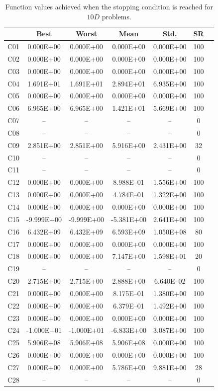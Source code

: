 \documentclass[conference]{IEEEtran}
\begin{document}
\clearpage
\begin{table}[!ht]
	\caption{Function values achieved when the stopping condition is reached for $10D$ problems.}
	\centering
	\begin{tabular}{|c|c|c|c|c|c|c|}
	\hline
     & Best & Worst & Mean & Std. & SR \\ \hline \hline
C01 & 0.000E+00 & 0.000E+00 & 0.000E+00 & 0.000E+00 &  100 \\ 
C02 & 0.000E+00 & 0.000E+00 & 0.000E+00 & 0.000E+00 &  100 \\ 
C03 & 0.000E+00 & 0.000E+00 & 0.000E+00 & 0.000E+00 &  100 \\ 
C04 & 1.691E+01 & 1.691E+01 & 2.894E+01 & 6.935E+00 &  100 \\ 
C05 & 0.000E+00 & 0.000E+00 & 0.000E+00 & 0.000E+00 &  100 \\ 
C06 & 6.965E+00 & 6.965E+00 & 1.421E+01 & 5.669E+00 &  100 \\ 
C07 &  -- &  -- &  -- &  -- &    0 \\ 
C08 &  -- &  -- &  -- &  -- &    0 \\ 
C09 & 2.851E+00 & 2.851E+00 & 5.916E+00 & 2.431E+00 &   32 \\ 
C10 &  -- &  -- &  -- &  -- &    0 \\ 
C11 &  -- &  -- &  -- &  -- &    0 \\ 
C12 & 0.000E+00 & 0.000E+00 & 8.988E--01 & 1.556E+00 &  100 \\ 
C13 & 0.000E+00 & 0.000E+00 & 4.784E--01 & 1.322E+00 &  100 \\ 
C14 & 0.000E+00 & 0.000E+00 & 0.000E+00 & 0.000E+00 &  100 \\ 
C15 & -9.999E+00 & -9.999E+00 & -5.381E+00 & 2.641E+00 &  100 \\ 
C16 & 6.432E+09 & 6.432E+09 & 6.593E+09 & 1.050E+08 &   80 \\ 
C17 & 0.000E+00 & 0.000E+00 & 0.000E+00 & 0.000E+00 &  100 \\ 
C18 & 0.000E+00 & 0.000E+00 & 7.147E+00 & 1.598E+01 &   20 \\ 
C19 &  -- &  -- &  -- &  -- &    0 \\ 
C20 & 2.715E+00 & 2.715E+00 & 2.888E+00 & 6.640E--02 &  100 \\ 
C21 & 0.000E+00 & 0.000E+00 & 8.175E--01 & 1.380E+00 &  100 \\ 
C22 & 0.000E+00 & 0.000E+00 & 6.379E--01 & 1.492E+00 &  100 \\ 
C23 & 0.000E+00 & 0.000E+00 & 0.000E+00 & 0.000E+00 &  100 \\ 
C24 & -1.000E+01 & -1.000E+01 & -6.833E+00 & 3.087E+00 &  100 \\ 
C25 & 5.906E+08 & 5.906E+08 & 5.906E+08 & 0.000E+00 &  100 \\ 
C26 & 0.000E+00 & 0.000E+00 & 0.000E+00 & 0.000E+00 &  100 \\ 
C27 & 0.000E+00 & 0.000E+00 & 5.786E+00 & 9.881E+00 &   28 \\ 
C28 &  -- &  -- &  -- &  -- &    0 \\ 
\hline
	\end{tabular}
	\label{tab:d10}
\end{table}
\end{document}
